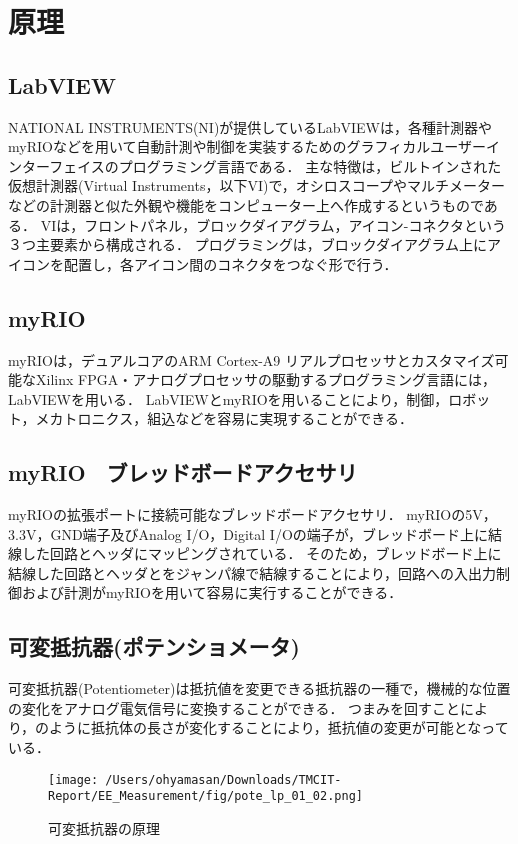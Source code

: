\section{原理}
\subsection{LabVIEW}
NATIONAL INSTRUMENTS(NI)が提供しているLabVIEWは，各種計測器やmyRIOなどを用いて自動計測や制御を実装するためのグラフィカルユーザーインターフェイスのプログラミング言語である．
主な特徴は，ビルトインされた仮想計測器(Virtual Instruments，以下VI)で，オシロスコープやマルチメーターなどの計測器と似た外観や機能をコンピューター上へ作成するというものである．
VIは，フロントパネル，ブロックダイアグラム，アイコン-コネクタという３つ主要素から構成される．
プログラミングは，ブロックダイアグラム上にアイコンを配置し，各アイコン間のコネクタをつなぐ形で行う．

\subsection{myRIO}
myRIOは，デュアルコアのARM Cortex-A9 リアルプロセッサとカスタマイズ可能なXilinx FPGA・アナログプロセッサの駆動するプログラミング言語には，LabVIEWを用いる．
LabVIEWとmyRIOを用いることにより，制御，ロボット，メカトロニクス，組込などを容易に実現することができる．

\subsection{myRIO　ブレッドボードアクセサリ}
myRIOの拡張ポートに接続可能なブレッドボードアクセサリ．
myRIOの5V，3.3V，GND端子及びAnalog I/O，Digital I/Oの端子が，ブレッドボード上に結線した回路とヘッダにマッピングされている．
そのため，ブレッドボード上に結線した回路とヘッダとをジャンパ線で結線することにより，回路への入出力制御および計測がmyRIOを用いて容易に実行することができる．

\subsection{可変抵抗器(ポテンショメータ)\cite{23r234r2}}
可変抵抗器(Potentiometer)は抵抗値を変更できる抵抗器の一種で，機械的な位置の変化をアナログ電気信号に変換することができる．
つまみを回すことにより，のように抵抗体の長さが変化することにより，抵抗値の変更が可能となっている．

\begin{figure}[h]
\centering
\texttt{[image: /Users/ohyamasan/Downloads/TMCIT-Report/EE\_Measurement/fig/pote\_lp\_01\_02.png]}
\caption{可変抵抗器の原理}
\label{fig:ALPS}
\end{figure}

